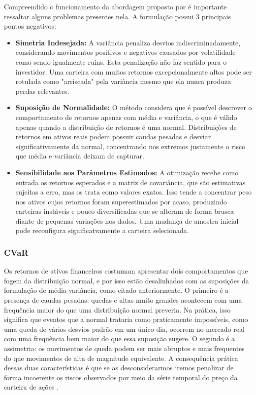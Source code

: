 \documentclass[12pt,a4paper]{article}
\begin{document}
Compreendido o funcionamento da abordagem proposto por  é importante ressaltar alguns problemas presentes nela. A formulação possui 3 principais pontos negativos: 
\begin{itemize}
  \item \textbf{Simetria Indesejada:} A variância penaliza desvios indiscriminadamente, considerando movimentos positivos e negativos causados por volatilidade como sendo igualmente ruins. 
  Esta penalização não faz sentido para o investidor. Uma carteira com muitos retornos excepcionalmente altos pode ser rotulada como "arriscada" pela variância mesmo que ela nunca produza perdas relevantes.
  \item \textbf{Suposição de Normalidade:} O método considera que é possível descrever o comportamento de retornos apenas com média e variância, o que é válido apenas quando a distribuição de retornos é uma normal. 
  Distribuições de retornos em ativos reais podem possuir caudas pesadas e desviar significativamente da normal, concentrando nos extremos justamente o risco que média e variância deixam de capturar.
  \item \textbf{Sensibilidade aos Parâmetros Estimados:} A otimização recebe como entrada os retornos esperados e a matriz de covariância, que são estimativas sujeitas a erro, mas os trata como valores exatos. 
  Isso tende a concentrar peso nos ativos cujos retornos foram superestimados por acaso, produzindo carteiras instáveis e pouco diversificadas que se alteram de forma brusca diante de pequenas variações nos dados. Uma mudança de amostra inicial pode reconfigura significatvamente a carteira selecionada.
\end{itemize}



\subsubsection{CVaR}

Os retornos de ativos financeiros costumam apresentar dois comportamentos que fogem 
da distribuição normal, e por isso estão desalinhados com as suposições da formulação de média-variância, como citado anteriormente. 
O primeiro é a presença de caudas pesadas: quedas e altas muito grandes acontecem com uma frequência 
maior do que uma distribuição normal preveria. Na prática, isso significa que eventos que a normal 
trataria como praticamente impossíveis, como uma queda de vários desvios padrão em um único dia, 
ocorrem no mercado real com uma frequência bem maior do que essa suposição sugere. O segundo é a 
assimetria: os movimentos de queda podem ser mais abruptos e mais frequentes do que movimentos de 
alta de magnitude equivalente. A consequência prática dessas duas características é que se as 
desconsiderarmos iremos penalizar de forma incoerente os riscos observados por meio da série temporal 
do preço da carteira de ações \cite{fabozzi2008portfolio, rockafellar2000optimization}. 
\end{document}
